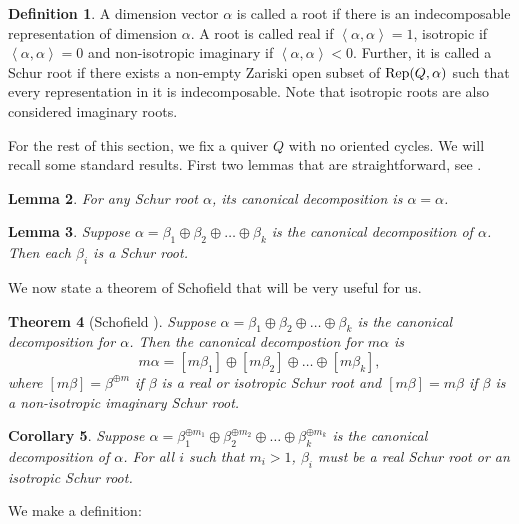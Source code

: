 \documentclass[11pt]{amsart}
\newtheorem{theorem}{Theorem}[section]
\newtheorem{corollary}[theorem]{Corollary}
\newtheorem{lemma}[theorem]{Lemma}
\theoremstyle{definition}
\newtheorem{definition}[theorem]{Definition}
\newcommand{\Rep}{{\rm Rep}}
\begin{document}
\begin{definition}
A dimension vector $\alpha$ is called a root if there is an indecomposable representation of dimension $\alpha$. A root is called real if $\left<\alpha,\alpha\right> = 1$, isotropic if $\left<\alpha,\alpha\right> = 0$ and non-isotropic imaginary if $\left<\alpha,\alpha\right> < 0$. Further, it is called a Schur root if there exists a non-empty Zariski open subset of $\Rep(Q,\alpha)$ such that every representation in it is indecomposable. Note that isotropic roots are also considered imaginary roots.
\end{definition}

For the rest of this section, we fix a quiver $Q$ with no oriented cycles. We will recall some standard results. First two lemmas that are straightforward, see \cite{DW,DW-book}.

\begin{lemma} \label{obvious}
For any Schur root $\alpha$, its canonical decomposition is $\alpha = \alpha$.
\end{lemma}

\begin{lemma}
Suppose $\alpha = \beta_1 \oplus \beta_2 \oplus \dots \oplus \beta_k$ is the canonical decomposition of $\alpha$. Then each $\beta_i$ is a Schur root. 
\end{lemma}

We now state a theorem of Schofield that will be very useful for us.

\begin{theorem} [Schofield \cite{Scho-gen}] \label{Scho-can-dec}
Suppose $\alpha = \beta_1 \oplus \beta_2 \oplus \dots \oplus \beta_k$ is the canonical decomposition for $\alpha$. Then the canonical decompostion for $m \alpha$ is 
$$
m \alpha = [m\beta_1] \oplus [m\beta_2] \oplus \dots \oplus [m\beta_k],
$$
where $[m \beta] = \beta^{\oplus m}$ if $\beta$ is a real or isotropic Schur root and $[m\beta] = m\beta$ if $\beta$ is a non-isotropic imaginary Schur root.
\end{theorem}



\begin{corollary}
Suppose $\alpha = \beta_1^{\oplus m_1} \oplus \beta_2^{\oplus m_2} \oplus \dots \oplus \beta_k^{\oplus m_k}$ is the canonical decomposition of $\alpha$. For all $i$ such that $m_i > 1$, $\beta_i$ must be a real Schur root or an isotropic Schur root.
\end{corollary}


We make a definition:
\end{document}
